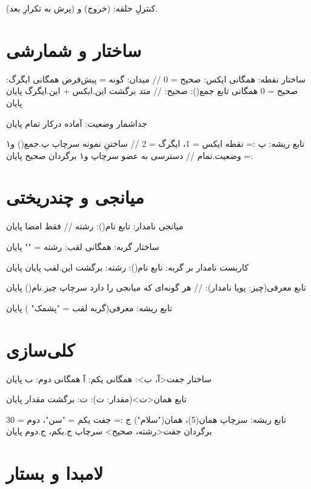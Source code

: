 کنترلِ حلقه:  (خروج) و  (پرش به تکرارِ بعد).

\section{ساختار و شمارشی}

\begin{salamfa}
ساختار نقطه:
    همگانی ایکس: صحیح = 0                // میدان: گونه = پیش‌فرض
    همگانی ایگرگ: صحیح = 0
    همگانی تابع جمع(): صحیح:            // متد
        برگشت این.ایکس + این.ایگرگ
    پایان
پایان

جداشمار وضعیت:
    آماده
    درکار
    تمام
پایان

تابع ریشه:
    پ := نقطه { ایکس = 1، ایگرگ = 2 }   // ساختنِ نمونه
    سرچاپ پ.جمع()
    و۱ := وضعیت.تمام                     // دسترسی به عضو
    سرچاپ و۱ برگردان صحیح
پایان
\end{salamfa}

\section{میانجی و چندریختی}

\begin{salamfa}
میانجی نامدار:
    تابع نام(): رشته                     // فقط امضا
پایان

ساختار گربه:
    همگانی لقب: رشته = ""
پایان

کاربست نامدار بر گربه:
    تابع نام(): رشته: برگشت این.لقب پایان
پایان

تابع معرفی(چیز: پویا نامدار):          // هر گونه‌ای که میانجی را دارد
    سرچاپ چیز.نام()
پایان

تابع ریشه:
    معرفی(گربه { لقب = "پشمک" })
پایان
\end{salamfa}

\section{کلی‌سازی}

\begin{salamfa}
ساختار جفت<آ، ب>:
    همگانی یکم: آ
    همگانی دوم: ب
پایان

تابع همان<ت>(مقدار: ت): ت:
    برگشت مقدار
پایان

تابع ریشه:
    سرچاپ همان(5)، همان("سلام")
    ج := جفت { یکم = "سن"، دوم = 30 } برگردان جفت<رشته، صحیح>
    سرچاپ ج.یکم، ج.دوم
پایان
\end{salamfa}

\section{لامبدا و بستار}

